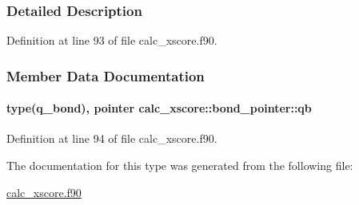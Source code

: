 \subsubsection{Detailed Description}


Definition at line 93 of file calc\-\_\-xscore.\-f90.



\subsubsection{Member Data Documentation}
\hypertarget{structcalc__xscore_1_1bond__pointer_ae75b8ebbda1abad5fed29b4f4ff6ad77}{
\paragraph[{qb}]{\setlength{\rightskip}{0pt plus 5cm}type({\bf q\-\_\-bond}), pointer calc\-\_\-xscore\-::bond\-\_\-pointer\-::qb}}\label{structcalc__xscore_1_1bond__pointer_ae75b8ebbda1abad5fed29b4f4ff6ad77}


Definition at line 94 of file calc\-\_\-xscore.\-f90.



The documentation for this type was generated from the following file\-:\begin{DoxyCompactItemize}
\item 
\hyperlink{calc__xscore_8f90}{calc\-\_\-xscore.\-f90}\end{DoxyCompactItemize}
